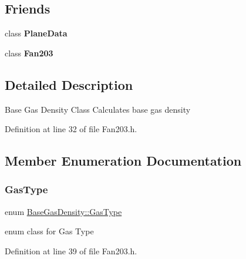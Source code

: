 \subsection*{Friends}
\begin{DoxyCompactItemize}
\item 
\mbox{\label{class_base_gas_density_a31f6bbdce0894df6a817f493afffda84}} 
class {\bfseries Plane\+Data}
\item 
\mbox{\label{class_base_gas_density_ad537df0087a4a6f474dc9d50579cc33d}} 
class {\bfseries Fan203}
\end{DoxyCompactItemize}


\subsection{Detailed Description}
Base Gas Density Class Calculates base gas density 

Definition at line 32 of file Fan203.\+h.



\subsection{Member Enumeration Documentation}
\mbox{\label{class_base_gas_density_afb215e48f6193462521b7e8d47306ed3}} 
\subsubsection{\texorpdfstring{Gas\+Type}{GasType}\hspace{0.1cm}{\footnotesize\ttfamily [1/3]}}
{\footnotesize\ttfamily enum \hyperlink{class_base_gas_density_afb215e48f6193462521b7e8d47306ed3}{Base\+Gas\+Density\+::\+Gas\+Type}\hspace{0.3cm}{\ttfamily [strong]}}

enum class for Gas Type 

Definition at line 39 of file Fan203.\+h.

\mbox{\label{class_base_gas_density_afb215e48f6193462521b7e8d47306ed3}} 
